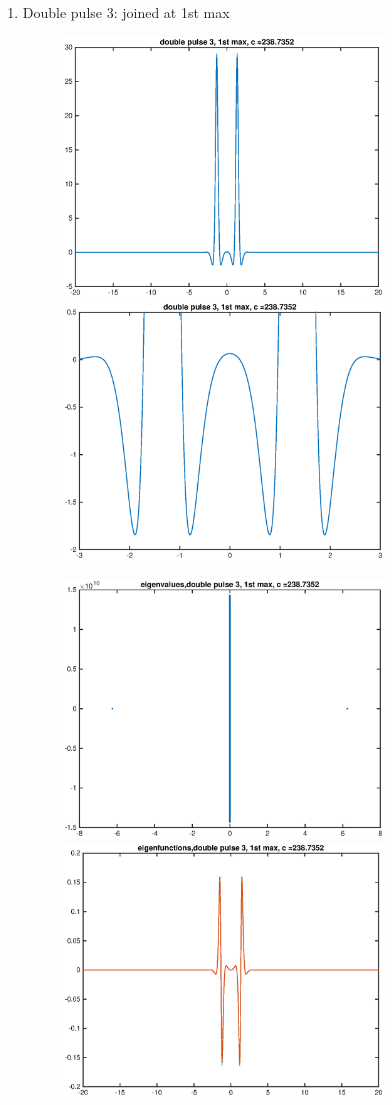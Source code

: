 \documentclass[12pt]{article}
\begin{document}
\begin{enumerate}
	\item Double pulse 3: joined at 1st max
	\begin{figure}[H]
	\includegraphics[width=8.5cm]{1double3.eps}
	\includegraphics[width=8.5cm]{1double3zoom.eps}
	\end{figure}
	\begin{figure}[H]
	\includegraphics[width=8.5cm]{1double3eig.eps}
	\includegraphics[width=8.5cm]{1double3eigfn.eps}
	\end{figure}


\end{enumerate}
\end{document}
